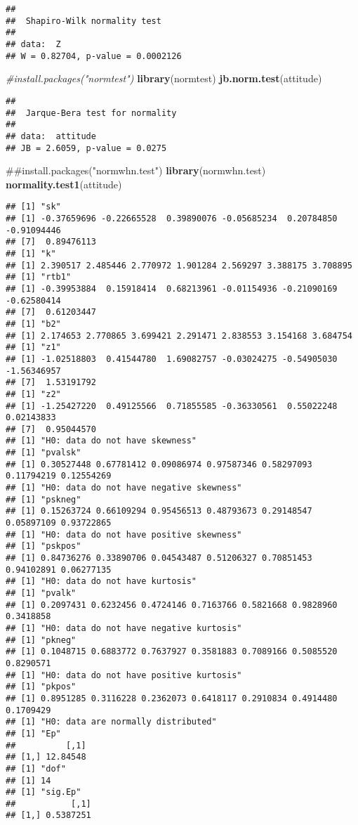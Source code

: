 \documentclass[]{article}
\newenvironment{Shaded}{\begin{snugshade}}{\end{snugshade}}
\newcommand{\KeywordTok}[1]{\textcolor[rgb]{0.13,0.29,0.53}{\textbf{#1}}}
\newcommand{\CommentTok}[1]{\textcolor[rgb]{0.56,0.35,0.01}{\textit{#1}}}
\newcommand{\NormalTok}[1]{#1}
\begin{document}
\begin{verbatim}
## 
##  Shapiro-Wilk normality test
## 
## data:  Z
## W = 0.82704, p-value = 0.0002126
\end{verbatim}

\begin{Shaded}
\begin{Highlighting}[]
\CommentTok{#install.packages("normtest")}
\KeywordTok{library}\NormalTok{(normtest)}
\KeywordTok{jb.norm.test}\NormalTok{(attitude)}
\end{Highlighting}
\end{Shaded}

\begin{verbatim}
## 
##  Jarque-Bera test for normality
## 
## data:  attitude
## JB = 2.6059, p-value = 0.0275
\end{verbatim}

\begin{Shaded}
\begin{Highlighting}[]
\NormalTok{##install.packages("normwhn.test")}
\KeywordTok{library}\NormalTok{(normwhn.test)}
\KeywordTok{normality.test1}\NormalTok{(attitude)}
\end{Highlighting}
\end{Shaded}

\begin{verbatim}
## [1] "sk"
## [1] -0.37659696 -0.22665528  0.39890076 -0.05685234  0.20784850 -0.91094446
## [7]  0.89476113
## [1] "k"
## [1] 2.390517 2.485446 2.770972 1.901284 2.569297 3.388175 3.708895
## [1] "rtb1"
## [1] -0.39953884  0.15918414  0.68213961 -0.01154936 -0.21090169 -0.62580414
## [7]  0.61203447
## [1] "b2"
## [1] 2.174653 2.770865 3.699421 2.291471 2.838553 3.154168 3.684754
## [1] "z1"
## [1] -1.02518803  0.41544780  1.69082757 -0.03024275 -0.54905030 -1.56346957
## [7]  1.53191792
## [1] "z2"
## [1] -1.25427220  0.49125566  0.71855585 -0.36330561  0.55022248  0.02143833
## [7]  0.95044570
## [1] "H0: data do not have skewness"
## [1] "pvalsk"
## [1] 0.30527448 0.67781412 0.09086974 0.97587346 0.58297093 0.11794219 0.12554269
## [1] "H0: data do not have negative skewness"
## [1] "pskneg"
## [1] 0.15263724 0.66109294 0.95456513 0.48793673 0.29148547 0.05897109 0.93722865
## [1] "H0: data do not have positive skewness"
## [1] "pskpos"
## [1] 0.84736276 0.33890706 0.04543487 0.51206327 0.70851453 0.94102891 0.06277135
## [1] "H0: data do not have kurtosis"
## [1] "pvalk"
## [1] 0.2097431 0.6232456 0.4724146 0.7163766 0.5821668 0.9828960 0.3418858
## [1] "H0: data do not have negative kurtosis"
## [1] "pkneg"
## [1] 0.1048715 0.6883772 0.7637927 0.3581883 0.7089166 0.5085520 0.8290571
## [1] "H0: data do not have positive kurtosis"
## [1] "pkpos"
## [1] 0.8951285 0.3116228 0.2362073 0.6418117 0.2910834 0.4914480 0.1709429
## [1] "H0: data are normally distributed"
## [1] "Ep"
##          [,1]
## [1,] 12.84548
## [1] "dof"
## [1] 14
## [1] "sig.Ep"
##           [,1]
## [1,] 0.5387251
\end{verbatim}
\end{document}
